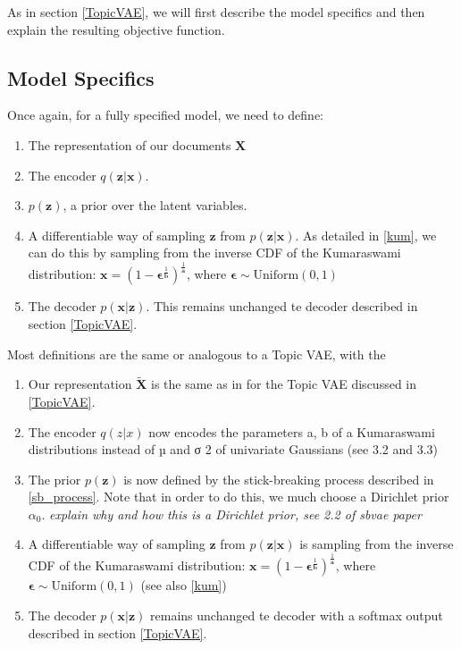 \documentclass{report}
\begin{document}
As in section \ref{TopicVAE}, we will first describe the model specifics and then explain the resulting objective function.
\subsection{Model Specifics}
Once again, for a fully specified model, we need to define:
\begin{enumerate}
	\item The representation of our documents $\mathbf{X}$
	\item The encoder $q(\mathbf{z}|\mathbf{x})$.
	\item $p(\mathbf{z})$, a prior  over the latent variables. 
	\item A differentiable way of sampling $\mathbf{z}$ from $p(\mathbf{z}|\mathbf{x})$. As detailed in \ref{kum}, we can do this by sampling from the inverse CDF of the Kumaraswami distribution: $\mathbf{x} = (1-\boldsymbol{\epsilon}^{\frac{1}{\mathbf{b}}})^{\frac{1}{\mathbf{a}}}$, where $\boldsymbol{\epsilon} \sim \text{Uniform}(0,1)$
	\item The decoder $p(\mathbf{x}|\mathbf{z})$. This remains unchanged te decoder described in section \ref{TopicVAE}.
\end{enumerate}

Most definitions are the same or analogous to a Topic VAE, with the

\begin{enumerate}
	\item Our representation  $\tilde{\mathbf{X}} $ is the same as in for the Topic VAE discussed in \ref{TopicVAE}.
	\item The encoder $q(z|x)$ now encodes the parameters {a, b} of a Kumaraswami distributions
	instead of µ and σ
	2 of univariate Gaussians (see 3.2 and 3.3)
	\item The prior $p(\mathbf{z})$ is now defined by the stick-breaking process described in \ref{sb_process}. Note that in order to do this, we much choose a Dirichlet prior $\alpha_0$. \textit{explain why and how this is a Dirichlet prior, see 2.2 of sbvae paper}
	\item A differentiable way of sampling $\mathbf{z}$ from $p(\mathbf{z}|\mathbf{x})$ is sampling from the inverse CDF of the Kumaraswami distribution: $\mathbf{x} = (1-\boldsymbol{\epsilon}^{\frac{1}{\mathbf{b}}})^{\frac{1}{\mathbf{a}}}$, where $\boldsymbol{\epsilon} \sim \text{Uniform}(0,1)$ (see also \ref{kum})
	\item The decoder $p(\mathbf{x}|\mathbf{z})$ remains unchanged te decoder with a softmax output described in section \ref{TopicVAE}.
\end{enumerate}
\end{document}
